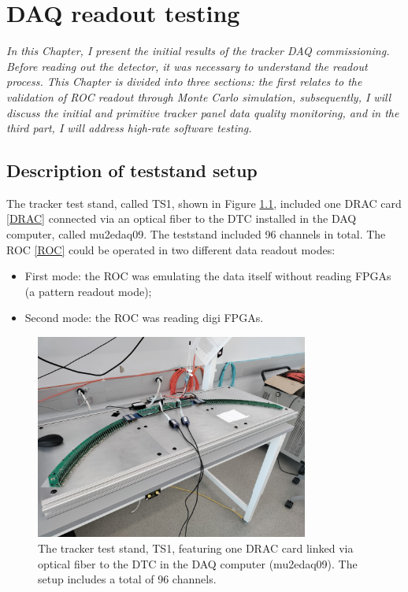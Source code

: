 \chapter{DAQ readout testing}
\textit{In this Chapter, I present the initial results of the tracker DAQ commissioning. Before reading out the detector, 
    it was necessary to understand the readout process. This Chapter is divided into three sections: the first relates 
    to the validation of ROC readout through Monte Carlo simulation, subsequently, I will discuss the initial and primitive tracker panel data quality monitoring, 
    and in the third part, I will address high-rate software testing.}
  \section{Description of teststand setup}\label{des}
    The tracker test stand,  called TS1, shown in Figure \ref{fig:TS1}, included one DRAC card \ref{DRAC} connected via an optical fiber
    to the DTC installed in the DAQ computer, called mu2edaq09. The teststand included 96 channels in total.
    The ROC \ref{ROC} could be operated in two different data readout modes:
    \begin{itemize}
    \item  First mode: the ROC was emulating the data itself without reading FPGAs (a pattern readout mode);
    \item  Second mode: the ROC was reading digi FPGAs.
    \end{itemize}
    \begin{figure}[!h]
        \centering
        \includegraphics[width =0.8\textwidth]{figures/jpg/IMG_20240219_090538.jpg}
        \caption{The tracker test stand, TS1, featuring one DRAC card linked via optical fiber to the DTC in the DAQ computer (mu2edaq09). The setup includes a total of 96 channels.}
        \label{fig:TS1}
        \end{figure}
